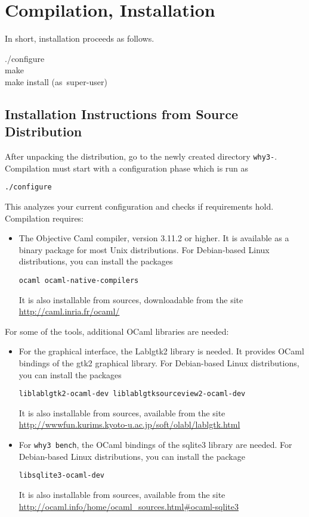 
\chapter{Compilation, Installation}
\label{sec:install}


In short, installation proceeds as follows.
\begin{flushleft}\ttfamily
  ./configure\\
  make\\
  make install \mbox{\rmfamily (as super-user)}
\end{flushleft}

\section{Installation Instructions from Source Distribution}

After unpacking the distribution, go to the newly created directory
\texttt{why3-\whyversion}. Compilation must start with a
configuration phase which is run as 
\begin{verbatim}
./configure
\end{verbatim}
This analyzes your current configuration and checks if requirements hold.
Compilation requires:
\begin{itemize}
\item The Objective Caml compiler, version 3.11.2 or higher. It is
  available as a binary package for most Unix distributions. For
  Debian-based Linux distributions, you can install the packages
\begin{verbatim}
ocaml ocaml-native-compilers
\end{verbatim}
It is also installable from sources, downloadable from the site
\url{http://caml.inria.fr/ocaml/}
\end{itemize}

\noindent
For some of the \why tools, additional OCaml libraries are needed:
\begin{itemize}
\item For the graphical interface, the Lablgtk2 library is needed.
  It provides OCaml
  bindings of the gtk2 graphical library. For Debian-based Linux
  distributions, you can install the packages
\begin{verbatim}
liblablgtk2-ocaml-dev liblablgtksourceview2-ocaml-dev
\end{verbatim}
It is also installable from sources, available from the site
\url{http://wwwfun.kurims.kyoto-u.ac.jp/soft/olabl/lablgtk.html}

\item For \texttt{why3 bench}, the OCaml bindings of the sqlite3 library
are needed.
For Debian-based Linux distributions, you can install the package
\begin{verbatim}
libsqlite3-ocaml-dev
\end{verbatim}
It is also installable from sources, available from the site
\url{http://ocaml.info/home/ocaml_sources.html#ocaml-sqlite3}
\end{itemize}


